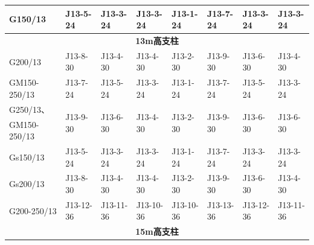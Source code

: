 \begin{longtable}[c]{|p{1.5cm}|p{1cm}|p{1cm}|p{1cm}|p{1cm}|p{1cm}|p{1cm}|p{1cm}|}
	\multicolumn{1}{|l|}{G150/13} &
	\multicolumn{1}{l|}{J13-5-24} &
	\multicolumn{1}{l|}{J13-3-24} &
	\multicolumn{1}{l|}{J13-3-24} &
	\multicolumn{1}{l|}{J13-1-24} &
	\multicolumn{1}{l|}{J13-7-24} &
	\multicolumn{1}{l|}{J13-3-24} &
	J13-3-24 \\ \hline
	\multicolumn{8}{|c|}{\textbf{13m高支柱}} \\ \hline
	\multicolumn{1}{|l|}{G200/13} &
	\multicolumn{1}{l|}{J13-8-30} &
	\multicolumn{1}{l|}{J13-4-30} &
	\multicolumn{1}{l|}{J13-4-30} &
	\multicolumn{1}{l|}{J13-2-30} &
	\multicolumn{1}{l|}{J13-9-30} &
	\multicolumn{1}{l|}{J13-6-30} &
	J13-4-30 \\ \hline
	\multicolumn{1}{|l|}{GM150-250/13} &
	\multicolumn{1}{l|}{J13-7-24} &
	\multicolumn{1}{l|}{J13-5-24} &
	\multicolumn{1}{l|}{J13-3-24} &
	\multicolumn{1}{l|}{J13-1-24} &
	\multicolumn{1}{l|}{J13-7-24} &
	\multicolumn{1}{l|}{J13-5-24} &
	J13-3-24 \\ \hline
	\multicolumn{1}{|l|}{G250/13、} &
	\multicolumn{1}{l|}{\multirow{2}{*}{J13-9-30}} &
	\multicolumn{1}{l|}{\multirow{2}{*}{J13-6-30}} &
	\multicolumn{1}{l|}{\multirow{2}{*}{J13-4-30}} &
	\multicolumn{1}{l|}{\multirow{2}{*}{J13-2-30}} &
	\multicolumn{1}{l|}{\multirow{2}{*}{J13-9-30}} &
	\multicolumn{1}{l|}{\multirow{2}{*}{J13-6-30}} &
	\multirow{2}{*}{J13-6-30} \\ \cline{1-1}
	\multicolumn{1}{|l|}{GM150-250/13} &
	\multicolumn{1}{l|}{} &
	\multicolumn{1}{l|}{} &
	\multicolumn{1}{l|}{} &
	\multicolumn{1}{l|}{} &
	\multicolumn{1}{l|}{} &
	\multicolumn{1}{l|}{} &
	\\ \hline
	\multicolumn{1}{|l|}{Gs150/13} &
	\multicolumn{1}{l|}{J13-5-24} &
	\multicolumn{1}{l|}{J13-3-24} &
	\multicolumn{1}{l|}{J13-3-24} &
	\multicolumn{1}{l|}{J13-1-24} &
	\multicolumn{1}{l|}{J13-7-24} &
	\multicolumn{1}{l|}{J13-3-24} &
	J13-3-24 \\ \hline
	\multicolumn{1}{|l|}{Gs200/13} &
	\multicolumn{1}{l|}{J13-8-30} &
	\multicolumn{1}{l|}{J13-4-30} &
	\multicolumn{1}{l|}{J13-4-30} &
	\multicolumn{1}{l|}{J13-2-30} &
	\multicolumn{1}{l|}{J13-9-30} &
	\multicolumn{1}{l|}{J13-6-30} &
	J13-4-30 \\ \hline
	\multicolumn{1}{|l|}{G200-250/13} &
	\multicolumn{1}{l|}{J13-12-36} &
	\multicolumn{1}{l|}{J13-11-36} &
	\multicolumn{1}{l|}{J13-10-36} &
	\multicolumn{1}{l|}{J13-10-36} &
	\multicolumn{1}{l|}{J13-13-36} &
	\multicolumn{1}{l|}{J13-12-36} &
	J13-11-36 \\ \hline
	\multicolumn{8}{|c|}{\textbf{15m高支柱}} \\ \hline

\end{longtable}
